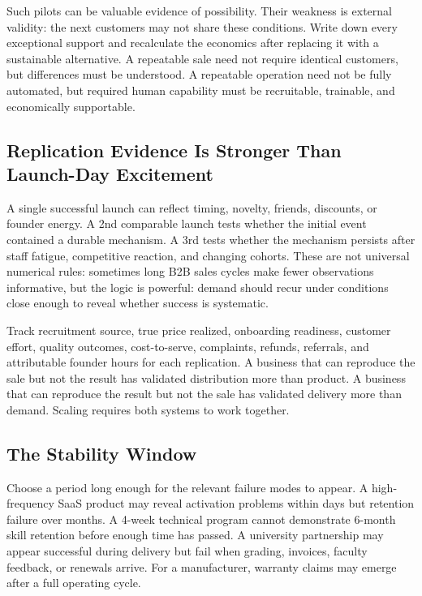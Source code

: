 Such pilots can be valuable evidence of possibility. Their weakness is external validity: the next customers may not share these conditions. Write down every exceptional support and recalculate the economics after replacing it with a sustainable alternative. A repeatable sale need not require identical customers, but differences must be understood. A repeatable operation need not be fully automated, but required human capability must be recruitable, trainable, and economically supportable.

\subsection{Replication Evidence Is Stronger Than Launch-Day Excitement}
\label{sec:replication_evidence_vs_excitement}

A single successful launch can reflect timing, novelty, friends, discounts, or founder energy. A 2nd comparable launch tests whether the initial event contained a durable mechanism. A 3rd tests whether the mechanism persists after staff fatigue, competitive reaction, and changing cohorts. These are not universal numerical rules: sometimes long B2B sales cycles make fewer observations informative, but the logic is powerful: demand should recur under conditions close enough to reveal whether success is systematic.

Track recruitment source, true price realized, onboarding readiness, customer effort, quality outcomes, cost-to-serve, complaints, refunds, referrals, and attributable founder hours for each replication. A business that can reproduce the sale but not the result has validated distribution more than product. A business that can reproduce the result but not the sale has validated delivery more than demand. Scaling requires both systems to work together.

\subsection{The Stability Window}
\label{sec:the_stability_window}

Choose a period long enough for the relevant failure modes to appear. A high-frequency SaaS product may reveal activation problems within days but retention failure over months. A 4-week technical program cannot demonstrate 6-month skill retention before enough time has passed. A university partnership may appear successful during delivery but fail when grading, invoices, faculty feedback, or renewals arrive. For a manufacturer, warranty claims may emerge after a full operating cycle.

